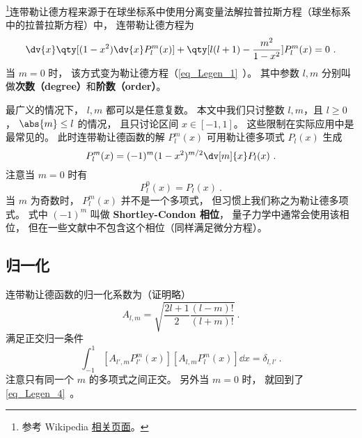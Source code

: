 

\footnote{参考 Wikipedia \href{https://en.wikipedia.org/wiki/Associated_Legendre_polynomials}{相关页面}。}连带勒让德方程来源于在球坐标系中使用分离变量法解拉普拉斯方程（球坐标系中的拉普拉斯方程）中， 连带勒让德方程为
\begin{equation}
\dv{x} \qty[(1-x^2)\dv{x} P_l^m(x)] + \qty[l(l+1) - \frac{m^2}{1-x^2}]P_l^m(x) = 0~.
\end{equation}
当 $m = 0$ 时， 该方式变为勒让德方程（\autoref{eq_Legen_1}~）。 其中参数 $l, m$ 分别叫做\textbf{次数（degree）}和\textbf{阶数（order）}。

最广义的情况下， $l,m$ 都可以是任意复数。 本文中我们只讨整数 $l,m$，且 $l\geq 0$， $\abs{m} \leq l$ 的情况， 且只讨论区间 $x\in [-1,1]$。 这些限制在实际应用中是最常见的。 此时连带勒让德函数的解 $P_l^m(x)$ 可用勒让德多项式 $P_l(x)$ 生成
\begin{equation}\label{eq_AsLgdr_1}
P_l^m(x) = (-1)^m (1 - x^2)^{m/2} \dv[m]{x} P_l(x)~.
\end{equation}
注意当 $m = 0$ 时有
\begin{equation}
P_l^0(x) = P_l(x)~.
\end{equation}
当 $m$ 为奇数时， $P_l^m(x)$ 并不是一个多项式， 但习惯上我们称之为勒让德多项式。 式中 $(-1)^m$ 叫做 \textbf{Shortley-Condon 相位}， 量子力学中通常会使用该相位， 但在一些文献中不包含这个相位（同样满足微分方程）。

\subsection{归一化}
连带勒让德函数的归一化系数为（证明略）
\begin{equation}\label{eq_AsLgdr_3}
A_{l,m} = \sqrt{\frac{2l+1}{2}\frac{(l-m)!}{(l+m)!}}~.
\end{equation}
满足正交归一条件
\begin{equation}\label{eq_AsLgdr_4}
\int_{-1}^1 [A_{l',m} P_{l'}^{m}(x)] [A_{l,m} P_l^{m}(x)] \dd{x} = \delta_{l,l'}~.
\end{equation}
注意只有同一个 $m$ 的多项式之间正交。 另外当 $m = 0$ 时， 就回到了\autoref{eq_Legen_4}~。

